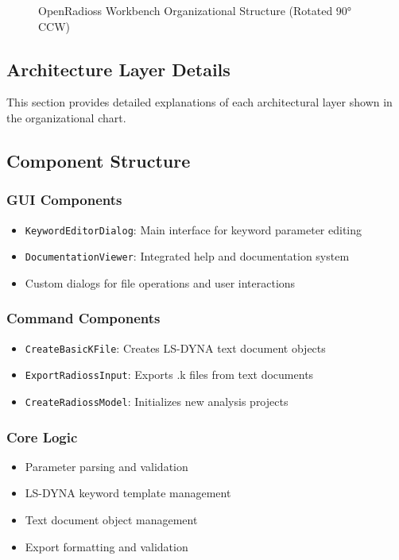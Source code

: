 \documentclass[12pt,a4paper]{article}
\begin{document}
\begin{figure}[H]
\begin{tikzpicture}
    \end{tikzpicture}
    \caption{OpenRadioss Workbench Organizational Structure (Rotated 90° CCW)}
    \label{fig:organigram}
\end{figure}

\clearpage
\subsection{Architecture Layer Details}
This section provides detailed explanations of each architectural layer shown in the organizational chart.

\subsection{Component Structure}

\subsubsection{GUI Components}
\begin{itemize}
    \item \texttt{KeywordEditorDialog}: Main interface for keyword parameter editing
    \item \texttt{DocumentationViewer}: Integrated help and documentation system
    \item Custom dialogs for file operations and user interactions
\end{itemize}

\subsubsection{Command Components}
\begin{itemize}
    \item \texttt{CreateBasicKFile}: Creates LS-DYNA text document objects
    \item \texttt{ExportRadiossInput}: Exports .k files from text documents
    \item \texttt{CreateRadiossModel}: Initializes new analysis projects
\end{itemize}

\subsubsection{Core Logic}
\begin{itemize}
    \item Parameter parsing and validation
    \item LS-DYNA keyword template management
    \item Text document object management
    \item Export formatting and validation
\end{itemize}
\end{document}
